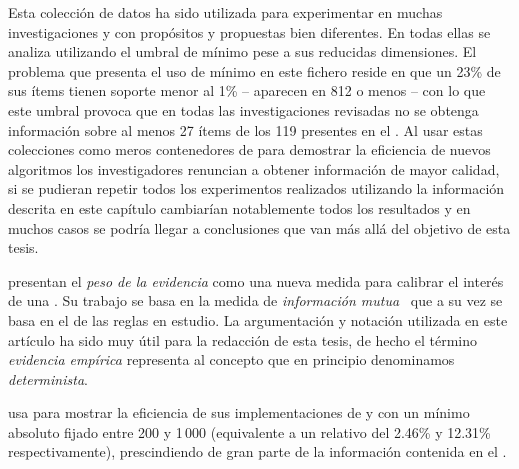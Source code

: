 \ABIERTO
{}

Esta colección de datos ha sido utilizada para experimentar en muchas investigaciones y con propósitos y propuestas bien diferentes. En todas ellas se analiza utilizando el umbral de \soporte mínimo pese a sus reducidas dimensiones. El problema que presenta el uso de \soporte mínimo en este fichero reside en que un 23\% de sus ítems tienen soporte menor al 1\% -- aparecen en 812 \transacciones o menos -- con lo que este umbral provoca que en todas las investigaciones revisadas no se obtenga información sobre al menos 27 ítems de los 119 presentes en el \dataset. Al usar estas colecciones como meros contenedores de \transacciones para demostrar la eficiencia de nuevos algoritmos los investigadores renuncian a obtener información de mayor calidad, si se pudieran repetir todos los experimentos realizados utilizando la información descrita en este capítulo cambiarían notablemente todos los resultados y en muchos casos se podría llegar a conclusiones que van más allá del objetivo de esta tesis.

\citet{WangWong-FromAssociationToClassificationInferenceUsingWeightOfEvidence-2003} presentan el \emph{peso de la evidencia} como una nueva medida para calibrar el interés de una \ar. Su trabajo se basa en la medida de \emph{información mutua}~\citep{no-la-tengo-y-no-la-consigo-1974} que a su vez se basa en el \soporte de las reglas en estudio. La argumentación y notación utilizada en este artículo ha sido muy útil para la redacción de esta tesis, de hecho el término \emph{evidencia empírica} representa al concepto que en principio denominamos \emph{\ar determinista}.

\citet{Borgelt-EfficientImplementationsOfAprioriAndEclat-2004} usa \mushroom para mostrar la eficiencia de sus implementaciones de \apriori y  con un \soporte mínimo absoluto fijado entre 200 y 1\,000 \transacciones (equivalente a un \soporte relativo del 2.46\% y 12.31\% respectivamente), prescindiendo de gran parte de la información contenida en el \dataset.

